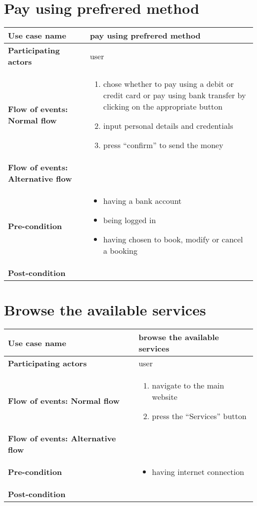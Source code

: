 \documentclass[a4paper, 13pt, draft]{report}
\begin{document}
\section*{Pay using prefrered method}

\begin{center}
    \begin{tabular}{| >{\bf}l | p{5.55cm} |} 
	\hline
	Use case name & pay using prefrered method \\ 
	\hline
	Participating actors & user \\
	\hline
	Flow of events: Normal flow & 
	\begin{enumerate}		
	    \item chose whether to pay using a debit or credit card or pay using bank transfer by clicking on the appropriate button
	    \item input personal details and credentials
	    \item press ``confirm'' to send the money
	\end{enumerate}	\\
	\hline
	Flow of events: Alternative flow & \notapplicable \\
	\hline
	Pre-condition & 
	\begin{itemize} 
	    \item having a bank account
	    \item being logged in
	    \item having chosen to book, modify or cancel a booking
	\end{itemize} \\
	\hline
	Post-condition & \notapplicable \\
	\hline
    \end{tabular}
\end{center}

\section*{Browse the available services}

\begin{center}
    \begin{tabular}{| >{\bf}l | p{5.55cm} |} 
	\hline
	Use case name & browse the available services \\ 
	\hline
	Participating actors & user \\
	\hline
	Flow of events: Normal flow & 
	\begin{enumerate}		
	    \item navigate to the main website
	    \item press the ``Services'' button
	\end{enumerate}	\\
	\hline
	Flow of events: Alternative flow & \notapplicable \\
	\hline
	Pre-condition & 
	\begin{itemize} 
	    \item having internet connection
	\end{itemize} \\
	\hline
	Post-condition & \notapplicable \\
	\hline
    \end{tabular}
\end{center}
\end{document}
